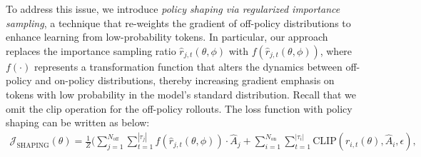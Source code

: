 \documentclass{article}
\begin{document}
To address this issue, we introduce \textit{policy shaping via regularized importance sampling}, a technique that re-weights the gradient of off-policy distributions to enhance learning from low-probability tokens. In particular, our approach replaces the importance sampling ratio $\hat{r}_{j,t}(\theta, \phi)$ with $f(\hat{r}_{j,t}(\theta, \phi))$, where $f(\cdot)$ represents a transformation function that alters the dynamics between off-policy and on-policy distributions, thereby increasing gradient emphasis on tokens with low probability in the model's standard distribution.
Recall that we omit the clip operation for the off-policy rollouts. The loss function with policy shaping can be written as below: 
\begin{equation}
    \begin{gathered}
        \mathcal{J}_{\text{SHAPING}}(\theta) = \frac{1}{Z} (\sum_{j=1}^{N_{\text{off}}} \sum_{t=1}^{|\tau_j|} 
        f(\hat{r}_{j,t}(\theta, \phi))\cdot \hat{A}_j
         + \sum_{i=1}^{N_{\text{on}}} \sum_{t=1}^{|\tau_i|} \text{CLIP}(r_{i,t}(\theta),\hat{A}_i, \epsilon), \\
    \end{gathered}
    \label{eq:reshape}
\end{equation} 
\end{document}
